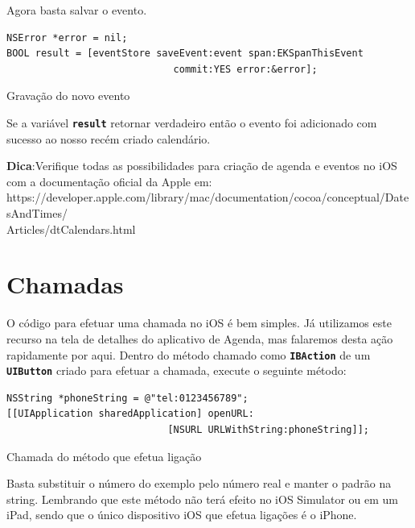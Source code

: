 \documentclass[a4paper,12pt,brazil,doubleside]{book}
\begin{document}
\begin{singlespace}
Agora basta salvar o evento.

\begin{listing}[H]
\begin{verbatim}
NSError *error = nil;
BOOL result = [eventStore saveEvent:event span:EKSpanThisEvent
                             commit:YES error:&error];
\end{verbatim}
\caption{Gravação do novo evento}
\end{listing}

Se a variável \texttt{\textbf{result}} retornar verdadeiro então o evento foi adicionado com sucesso ao nosso recém criado calendário.

\begin{framed}

\textbf{Dica}:Verifique todas as possibilidades para criação de agenda e eventos no iOS com a documentação oficial da Apple em:\\ https://developer.apple.com/library/mac/documentation/cocoa/conceptual/DatesAndTimes/\\Articles/dtCalendars.html
\end{framed}

\section{Chamadas}

O código para efetuar uma chamada no iOS é bem simples. Já utilizamos este recurso na tela de detalhes do aplicativo de Agenda, mas falaremos desta ação rapidamente por aqui.
Dentro do método chamado como \texttt{\textbf{IBAction}} de um \texttt{\textbf{UIButton}} criado para efetuar a chamada, execute o seguinte método:

\begin{listing}[H]
\begin{verbatim}
NSString *phoneString = @"tel:0123456789";
[[UIApplication sharedApplication] openURL:
                            [NSURL URLWithString:phoneString]];
\end{verbatim}
\caption{Chamada do método que efetua ligação}
\end{listing}


Basta substituir o número do exemplo pelo número real e manter o padrão na string. Lembrando que este método não terá efeito no iOS Simulator ou em um iPad, sendo que o único dispositivo iOS que efetua ligações é o iPhone.


\end{singlespace}
\end{document}
